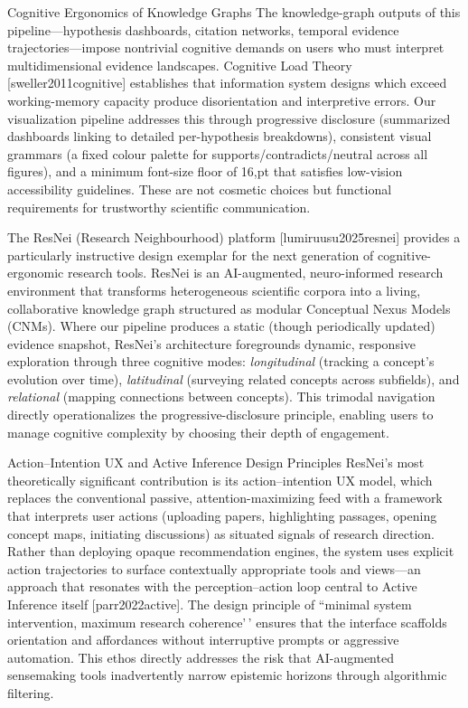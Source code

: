 \documentclass[
  ignorenonframetext,
]{beamer}
\providecommand{\citep}[1]{[#1]}
\begin{document}
\begin{frame}[allowframebreaks]{Cognitive Ergonomics of Knowledge
Graphs}
\protect{}\label{cognitive-ergonomics-of-knowledge-graphs}
The knowledge-graph outputs of this pipeline---hypothesis dashboards,
citation networks, temporal evidence trajectories---impose nontrivial
cognitive demands on users who must interpret multidimensional evidence
landscapes. Cognitive Load Theory \citep{sweller2011cognitive}
establishes that information system designs which exceed working-memory
capacity produce disorientation and interpretive errors. Our
visualization pipeline addresses this through progressive disclosure
(summarized dashboards linking to detailed per-hypothesis breakdowns),
consistent visual grammars (a fixed colour palette for
supports/contradicts/neutral across all figures), and a minimum
font-size floor of 16,pt that satisfies low-vision accessibility
guidelines. These are not cosmetic choices but functional requirements
for trustworthy scientific communication.

The ResNei (Research Neighbourhood) platform \citep{lumiruusu2025resnei}
provides a particularly instructive design exemplar for the next
generation of cognitive-ergonomic research tools. ResNei is an
AI-augmented, neuro-informed research environment that transforms
heterogeneous scientific corpora into a living, collaborative knowledge
graph structured as modular Conceptual Nexus Models (CNMs). Where our
pipeline produces a static (though periodically updated) evidence
snapshot, ResNei's architecture foregrounds dynamic, responsive
exploration through three cognitive modes: \textit{longitudinal}
(tracking a concept's evolution over time), \textit{latitudinal}
(surveying related concepts across subfields), and \textit{relational}
(mapping connections between concepts). This trimodal navigation
directly operationalizes the progressive-disclosure principle, enabling
users to manage cognitive complexity by choosing their depth of
engagement.

\begin{block}{Action--Intention UX and Active Inference Design
Principles}
\protect{}\label{actionintention-ux-and-active-inference-design-principles}
ResNei's most theoretically significant contribution is its
action--intention UX model, which replaces the conventional passive,
attention-maximizing feed with a framework that interprets user actions
(uploading papers, highlighting passages, opening concept maps,
initiating discussions) as situated signals of research direction.
Rather than deploying opaque recommendation engines, the system uses
explicit action trajectories to surface contextually appropriate tools
and views---an approach that resonates with the perception--action loop
central to Active Inference itself \citep{parr2022active}. The design
principle of ``minimal system intervention, maximum research
coherence'\,' ensures that the interface scaffolds orientation and
affordances without interruptive prompts or aggressive automation. This
ethos directly addresses the risk that AI-augmented sensemaking tools
inadvertently narrow epistemic horizons through algorithmic filtering.
\end{block}


\end{frame}
\end{document}
